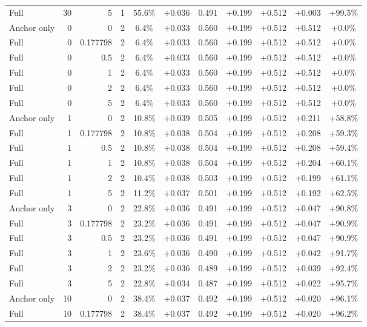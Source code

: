 \begin{table}[htbp]
\begin{tabular}{lrrrccccccc}
Full & 30 & 5 & 1 & 55.6\% & +0.036 & 0.491 & +0.199 & +0.512 & +0.003 & +99.5\% \\
Anchor only & 0 & 0 & 2 & 6.4\% & +0.033 & 0.560 & +0.199 & +0.512 & +0.512 & +0.0\% \\
Full & 0 & 0.177798 & 2 & 6.4\% & +0.033 & 0.560 & +0.199 & +0.512 & +0.512 & +0.0\% \\
Full & 0 & 0.5 & 2 & 6.4\% & +0.033 & 0.560 & +0.199 & +0.512 & +0.512 & +0.0\% \\
Full & 0 & 1 & 2 & 6.4\% & +0.033 & 0.560 & +0.199 & +0.512 & +0.512 & +0.0\% \\
Full & 0 & 2 & 2 & 6.4\% & +0.033 & 0.560 & +0.199 & +0.512 & +0.512 & +0.0\% \\
Full & 0 & 5 & 2 & 6.4\% & +0.033 & 0.560 & +0.199 & +0.512 & +0.512 & +0.0\% \\
Anchor only & 1 & 0 & 2 & 10.8\% & +0.039 & 0.505 & +0.199 & +0.512 & +0.211 & +58.8\% \\
Full & 1 & 0.177798 & 2 & 10.8\% & +0.038 & 0.504 & +0.199 & +0.512 & +0.208 & +59.3\% \\
Full & 1 & 0.5 & 2 & 10.8\% & +0.038 & 0.504 & +0.199 & +0.512 & +0.208 & +59.4\% \\
Full & 1 & 1 & 2 & 10.8\% & +0.038 & 0.504 & +0.199 & +0.512 & +0.204 & +60.1\% \\
Full & 1 & 2 & 2 & 10.4\% & +0.038 & 0.503 & +0.199 & +0.512 & +0.199 & +61.1\% \\
Full & 1 & 5 & 2 & 11.2\% & +0.037 & 0.501 & +0.199 & +0.512 & +0.192 & +62.5\% \\
Anchor only & 3 & 0 & 2 & 22.8\% & +0.036 & 0.491 & +0.199 & +0.512 & +0.047 & +90.8\% \\
Full & 3 & 0.177798 & 2 & 23.2\% & +0.036 & 0.491 & +0.199 & +0.512 & +0.047 & +90.9\% \\
Full & 3 & 0.5 & 2 & 23.2\% & +0.036 & 0.491 & +0.199 & +0.512 & +0.047 & +90.9\% \\
Full & 3 & 1 & 2 & 23.6\% & +0.036 & 0.490 & +0.199 & +0.512 & +0.042 & +91.7\% \\
Full & 3 & 2 & 2 & 23.2\% & +0.036 & 0.489 & +0.199 & +0.512 & +0.039 & +92.4\% \\
Full & 3 & 5 & 2 & 22.8\% & +0.034 & 0.487 & +0.199 & +0.512 & +0.022 & +95.7\% \\
Anchor only & 10 & 0 & 2 & 38.4\% & +0.037 & 0.492 & +0.199 & +0.512 & +0.020 & +96.1\% \\
Full & 10 & 0.177798 & 2 & 38.4\% & +0.037 & 0.492 & +0.199 & +0.512 & +0.020 & +96.2\% \\

\end{tabular}
\end{table}
